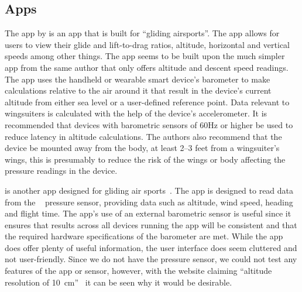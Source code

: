 \documentclass[11pt, a4paper, twocolumn]{article}
\begin{document}
\subsection{Apps}\label{sec:apps} %

The  app by \textcite{pfm_technologies_llc_l/d_2015} is an app that is built for ``gliding airsports''. The app allows for users to view their glide and lift-to-drag ratios, altitude, horizontal and vertical speeds among other things. The app seems to be built upon the much simpler  app from the same author that only offers altitude and descent speed readings.
The  app uses the handheld or wearable smart device's barometer to make calculations relative to the air around it that result in the device's current altitude from either sea level or a user-defined reference point. Data relevant to wingsuiters is calculated with the help of the device's accelerometer. It is recommended that devices with barometric sensors of 60Hz or higher be used to reduce latency in altitude calculations. The authors also recommend that the device be mounted away from the body, at least 2--3 feet from a wingsuiter's wings, this is presumably to reduce the risk of the wings or body affecting the pressure readings in the device.

 is another app designed for gliding air sports~\cite{dickie_blueflyvario_2016}. The app is designed to read data from the ~\cite{_blueflyvario_????} pressure sensor, providing data such as altitude, wind speed, heading and flight time.
The app's use of an external barometric sensor is useful since it ensures that results across all devices running the app will be consistent and that the required hardware specifications of the barometer are met.
While the app does offer plenty of useful information, the user interface does seem cluttered and not user-friendly. Since we do not have the  pressure sensor, we could not test any features of the app or sensor, however, with the website claiming ``altitude resolution of \SI{10}{\centi\metre}''~\cite{_blueflyvario_????} it can be seen why it would be desirable.
\end{document}
